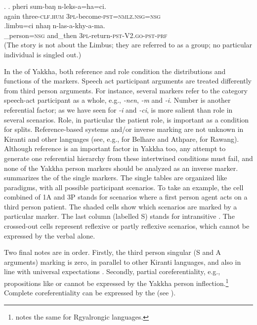 \ex. \ag.           pheri sum-baŋ       n-leks-a=ha=ci.\\
again three{\scshape -clf.hum} {\scshape 3pl-}become{\scshape -pst=nmlz.nsg=nsg}\\
 
\bg.limbu=ci nhaŋ n-las-a-khy-a-ma.\\
\_person{\scshape =nsg} and\_then {\scshape 3pl-}return{\scshape -pst-V2.go-pst-prf}\\
 (The story is not about the Limbus; they are referred to as  a group; no particular individual is singled out.) 

\newpage
In the  of Yakkha, both reference and role condition the distributions and functions of the markers. Speech act participant arguments are treated differently from third person arguments. For instance, several markers refer to the category speech-act participant as a whole, e.g., \emph{-nen}, \emph{-m} and \emph{-i}. Number is another referential factor; as we have seen for \emph{-i} and \emph{-ci},  is more salient than role in several scenarios. Role, in particular the patient role, is important as a condition for  splits. 
Reference-based systems and/or inverse marking are not unknown in Kiranti and other  languages  (see, e.g., \citet{Ebert1991Inverse} for Belhare and Athpare, \citet{LaPolla2007Hierarchical} for Rawang). Although reference is an important factor in Yakkha too, any attempt to generate one referential hierarchy from these intertwined conditions must  fail, and none of the Yakkha person markers should be analyzed as an inverse marker.  summarizes  the  of the single markers. The single tables are organized like paradigms, with all possible participant scenarios. To take an example, the cell combined of 1A and 3P stands for scenarios where a first person agent acts on a third person patient. The shaded cells show which  scenarios are marked by a particular marker. The last column (labelled S) stands for intransitive . The crossed-out cells represent reflexive or partly reflexive scenarios, which cannot be expressed by the verbal  alone.

Two final notes are in order. Firstly, the third person singular (S and A arguments) marking is zero, in parallel to other Kiranti languages, and also in line with universal expectations \citep{Siewierska2008_Person}. Secondly, partial coreferentiality, e.g., propositions like  or  cannot be expressed by the Yakkha person inflection.\footnote{\citet{Jacques2012_Agreement} notes the same for Rgyalrongic languages.}  Complete coreferentiality can be expressed by the   (see  ).

